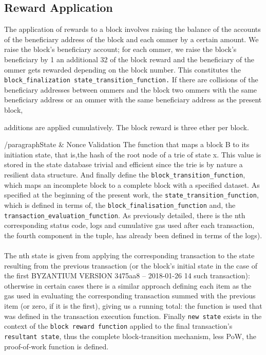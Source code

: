 \documentclass[10pt,letterpaper,leqno,bibliography=totoc]{scrartcl}
\newenvironment{alphafootnotes}
{\par\edef\savedfootnotenumber{\number\value{footnote}}
\renewcommand{\thefootnote}{\alph{footnote}}
\setcounter{footnote}{0}}
{\par\setcounter{footnote}{\savedfootnotenumber}}
\begin{document}
\begin{alphafootnotes}
\begin{multicols*}{2}
		\subsection{Reward Application} The application of rewards to a block involves raising the balance of the accounts of the beneficiary address of the block and each ommer by a certain amount. We raise the block’s beneficiary account; for each ommer, we raise the block’s beneficiary by 1 an additional 32 of the block reward and the beneficiary of the ommer gets rewarded depending on the block number. This constitutes the \texttt{block\_finalization state\_transition\_function.} If there are collisions of the beneficiary addresses between ommers and the block two ommers with the same beneficiary address or an ommer with the same beneficiary address as the present block,

			additions are applied cumulatively. The block reward is three ether per block. 
			
			/paragraph{State \& Nonce Validation} The function that maps a block B to its initiation state, that is,the hash of the root node of a trie of state x. This value is stored in the state database trivial and efficient since the trie is by nature a resilient data structure. And finally define the \texttt{block\_transition\_function}, which maps an incomplete block to a complete block with a specified dataset. As specified at the beginning of the present work, the \texttt{state\_transition\_function}, which is defined in terms of, the \texttt{block\_finalisation\_function} and, the \texttt{transaction\_evaluation\_function}. As previously detailed, there is the nth corresponding status code, logs and cumulative gas used after each transaction, the fourth component in the tuple, has already been defined in terms of the logs). 
		\paragraph{}The nth state is given from applying the corresponding transaction to the state resulting from the previous transaction (or the block’s initial state in the case of the first BYZANTIUM VERSION 3475aa8 -- 2018-01-26 14 such transaction): otherwise in certain cases there is a similar approach defining each item as the gas used in evaluating the corresponding transaction summed with the previous item (or zero, if it is the first), giving us a running total: the function is used that was defined in the transaction execution function. Finally \texttt{new state} exists in the context of the \texttt{block reward function} applied to the final transaction’s \texttt{resultant state}, thus the complete block-transition mechanism, less PoW, the proof-of-work function is defined. 
		

\end{multicols*}
\end{alphafootnotes}
\end{document}
